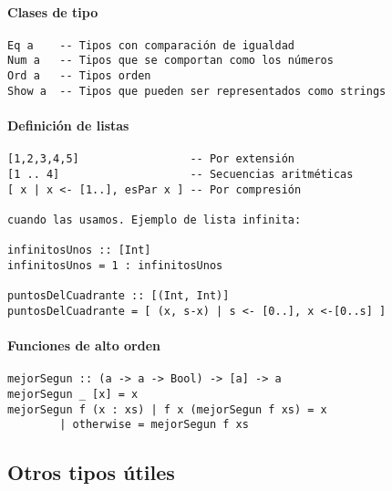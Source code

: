 \paragraph{Clases de tipo}
\begin{centrado}
	\begin{verbatim}
Eq a    -- Tipos con comparación de igualdad
Num a   -- Tipos que se comportan como los números
Ord a   -- Tipos orden
Show a  -- Tipos que pueden ser representados como strings
	\end{verbatim}
\end{centrado}

\paragraph{Definición de listas}
\begin{centrado}
	\begin{verbatim}
[1,2,3,4,5]                 -- Por extensión
[1 .. 4]                    -- Secuencias aritméticas
[ x | x <- [1..], esPar x ] -- Por compresión
		
cuando las usamos. Ejemplo de lista infinita:
		
infinitosUnos :: [Int]
infinitosUnos = 1 : infinitosUnos
		
puntosDelCuadrante :: [(Int, Int)]
puntosDelCuadrante = [ (x, s-x) | s <- [0..], x <-[0..s] ]
	\end{verbatim}
\end{centrado}

\paragraph{Funciones de alto orden}
\begin{centrado}
	\begin{verbatim}
mejorSegun :: (a -> a -> Bool) -> [a] -> a
mejorSegun _ [x] = x
mejorSegun f (x : xs) | f x (mejorSegun f xs) = x
		| otherwise = mejorSegun f xs
	\end{verbatim}
\end{centrado}

\subsection{Otros tipos útiles}
